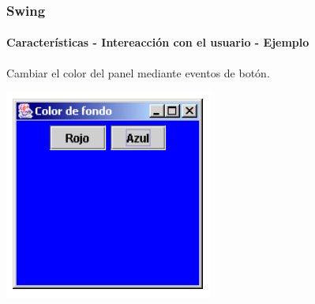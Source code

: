 \documentclass{beamer}
\begin{document}
	\begin{frame}
		\frametitle{Swing}
		\framesubtitle{Caracter\'isticas - Intereacci\'on con el usuario - Ejemplo}

        Cambiar el color del panel mediante eventos de bot\'on.
        \begin{center}
	        	\includegraphics[scale=.45]{images/colores.png}
	    \end{center}
	\end{frame}

{ %
    \begin{frame}[plain]
    \end{frame}
}
\end{document}
